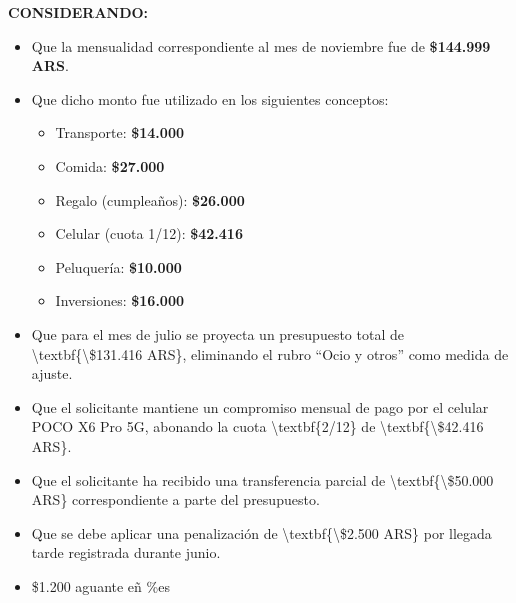\documentclass[12pt]{article}
\begin{document}
\textbf{CONSIDERANDO:}
\begin{itemize}
  \item Que la mensualidad correspondiente al mes de noviembre fue de \textbf{\$144.999 ARS}.
  \item Que dicho monto fue utilizado en los siguientes conceptos:
    \begin{itemize}
      
      \item Transporte: \textbf{\$14.000}
      
      \item Comida: \textbf{\$27.000}
      
      \item Regalo (cumpleaños): \textbf{\$26.000}
      
      \item Celular (cuota 1/12): \textbf{\$42.416}
      
      \item Peluquería: \textbf{\$10.000}
      
      \item Inversiones: \textbf{\$16.000}
      
    \end{itemize}
  
  \item Que para el mes de julio se proyecta un presupuesto total de \textbackslash{}textbf\{\textbackslash{}\$131.416 ARS\}, eliminando el rubro “Ocio y otros” como medida de ajuste.
  
  \item Que el solicitante mantiene un compromiso mensual de pago por el celular POCO X6 Pro 5G, abonando la cuota \textbackslash{}textbf\{2/12\} de \textbackslash{}textbf\{\textbackslash{}\$42.416 ARS\}.
  
  \item Que el solicitante ha recibido una transferencia parcial de \textbackslash{}textbf\{\textbackslash{}\$50.000 ARS\} correspondiente a parte del presupuesto.
  
  \item Que se debe aplicar una penalización de \textbackslash{}textbf\{\textbackslash{}\$2.500 ARS\} por llegada tarde registrada durante junio.
  
  \item \$1.200 aguante eñ \%es
  
\end{itemize}

\vspace{0.4cm}
\end{document}
